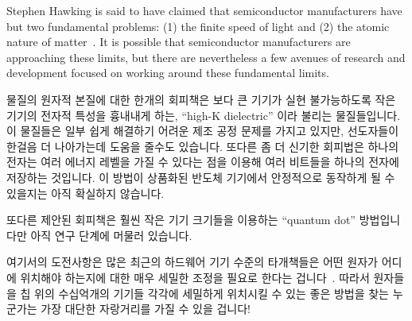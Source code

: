 Stephen Hawking is said to have claimed that semiconductor manufacturers
have but two fundamental problems: (1) the finite speed of light and
(2) the atomic nature of matter~\cite{BryanGardiner2007}.
It is possible that semiconductor manufacturers are approaching these
limits, but there are nevertheless a few avenues of research and
development focused on working around these fundamental limits.
\fi

물질의 원자적 본질에 대한 한개의 회피책은 보다 큰 기기가 실현 불가능하도록
작은 기기의 전자적 특성을 흉내내게 하는, ``high-K dielectric'' 이라 불리는
물질들입니다.
이 물질들은 일부 쉽게 해결하기 어려운 제조 공정 문제를 가지고 있지만,
선도자들이 한걸음 더 나아가는데 도움을 줄수도 있습니다.
또다른 좀 더 신기한 회피법은 하나의 전자는 여러 에너지 레벨을 가질 수 있다는
점을 이용해 여러 비트들을 하나의 전자에 저장하는 것입니다.
이 방법이 상품화된 반도체 기기에서 안정적으로 동작하게 될 수 있을지는 아직
확실하지 않습니다.

또다른 제안된 회피책은 훨씬 작은 기기 크기들을 이용하는 ``quantum dot''
방법입니다만 아직 연구 단계에 머물러 있습니다.
\iffalse

One workaround for the atomic nature of matter are so-called
``high-K dielectric'' materials, which allow larger devices to mimic the
electrical properties of infeasibly small devices.
These materials pose some severe fabrication challenges, but nevertheless
may help push the frontiers out a bit farther.
Another more-exotic workaround stores multiple bits in a single electron,
relying on the fact that a given electron can exist at a number of
energy levels.
It remains to be seen if this particular approach can be made to work
reliably in production semiconductor devices.

Another proposed workaround is the ``quantum dot'' approach that
allows much smaller device sizes, but which is still in the research
stage.
\fi

여기서의 도전사항은 많은 최근의 하드웨어 기기 수준의 타개책들은 어떤 원자가
어디에 위치해야 하는지에 대한 매우 세밀한 조정을 필요로 한다는
겁니다~\cite{MichaelJKelly2017DeviceLevel}.
따라서 원자들을 칩 위의 수십억개의 기기들 각각에 세밀하게 위치시킬 수 있는 좋은
방법을 찾는 누군가는 가장 대단한 자랑거리를 가질 수 있을 겁니다!
\iffalse

One challenge is that many recent hardware-device-level breakthroughs
require very tight control of which atoms are placed
where~\cite{MichaelJKelly2017DeviceLevel}.
It therefore seems likely that whoever finds a good way to hand-place
atoms on each of the billions of devices on a chip will have most
excellent bragging rights, if nothing else!
\fi


